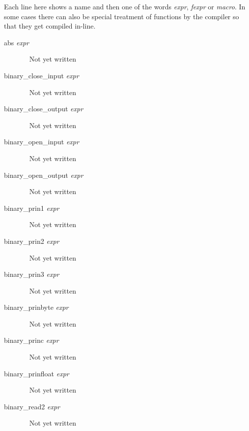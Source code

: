 \documentclass[a4paper,11pt]{article}
\begin{document}
Each line here shows a name and then one of the words {\itshape  expr},
{\itshape  fexpr} or {\itshape  macro}. In some cases there can also be special
treatment of functions by the compiler so that they get compiled in-line.
\begin{description}

\item [{\ttfamily abs} {\itshape  expr}] ~\newline
Not yet written

\item [{\ttfamily binary\_close\_input} {\itshape  expr}] ~\newline
Not yet written

\item [{\ttfamily binary\_close\_output} {\itshape  expr}] ~\newline
Not yet written

\item [{\ttfamily binary\_open\_input} {\itshape  expr}] ~\newline
Not yet written

\item [{\ttfamily binary\_open\_output} {\itshape  expr}] ~\newline
Not yet written

\item [{\ttfamily binary\_prin1} {\itshape  expr}] ~\newline
Not yet written

\item [{\ttfamily binary\_prin2} {\itshape  expr}] ~\newline
Not yet written

\item [{\ttfamily binary\_prin3} {\itshape  expr}] ~\newline
Not yet written

\item [{\ttfamily binary\_prinbyte} {\itshape  expr}] ~\newline
Not yet written

\item [{\ttfamily binary\_princ} {\itshape  expr}] ~\newline
Not yet written

\item [{\ttfamily binary\_prinfloat} {\itshape  expr}] ~\newline
Not yet written

\item [{\ttfamily binary\_read2} {\itshape  expr}] ~\newline
Not yet written


\end{description}
\end{document}
